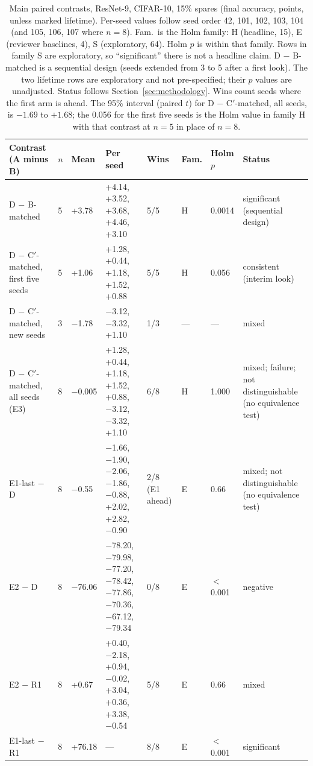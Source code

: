 \documentclass[journal]{IEEEtran}
\begin{document}
\begin{table}[t]
\centering
\caption{Main paired contrasts, ResNet-9, CIFAR-10, 15\% spares (final accuracy, points, unless marked lifetime). Per-seed values follow seed order 42, 101, 102, 103, 104 (and 105, 106, 107 where $n=8$). Fam.\ is the Holm family: H (headline, 15), E (reviewer baselines, 4), S (exploratory, 64). Holm $p$ is within that family. Rows in family S are exploratory, so ``significant'' there is not a headline claim. D $-$ B-matched is a sequential design (seeds extended from 3 to 5 after a first look). The two lifetime rows are exploratory and not pre-specified; their $p$ values are unadjusted. Status follows Section~\ref{sec:methodology}. Wins count seeds where the first arm is ahead. The 95\% interval (paired $t$) for D $-$ C$'$-matched, all seeds, is $-1.69$ to $+1.68$; the 0.056 for the first five seeds is the Holm value in family H with that contrast at $n=5$ in place of $n=8$.}
\label{tab:main}
\small
\begin{tabular}{p{3.0cm}p{0.4cm}p{0.95cm}p{4.6cm}p{1.35cm}p{0.55cm}p{1.15cm}p{2.3cm}}
\toprule
Contrast (A minus B) & $n$ & Mean & Per seed & Wins & Fam. & Holm $p$ & Status \\
\midrule
D $-$ B-matched & 5 & +3.78 & +4.14, +3.52, +3.68, +4.46, +3.10 & 5/5 & H & 0.0014 & significant (sequential design) \\
D $-$ C$'$-matched, first five seeds & 5 & +1.06 & +1.28, +0.44, +1.18, +1.52, +0.88 & 5/5 & H & 0.056 & consistent (interim look) \\
D $-$ C$'$-matched, new seeds & 3 & $-$1.78 & $-$3.12, $-$3.32, +1.10 & 1/3 & --- & --- & mixed \\
D $-$ C$'$-matched, all seeds (E3) & 8 & $-$0.005 & +1.28, +0.44, +1.18, +1.52, +0.88, $-$3.12, $-$3.32, +1.10 & 6/8 & H & 1.000 & mixed; failure; not distinguishable (no equivalence test) \\
E1-last $-$ D & 8 & $-$0.55 & $-$1.66, $-$1.90, $-$2.06, $-$1.86, $-$0.88, +2.02, +2.82, $-$0.90 & 2/8 (E1 ahead) & E & 0.66 & mixed; not distinguishable (no equivalence test) \\
E2 $-$ D & 8 & $-$76.06 & $-$78.20, $-$79.98, $-$77.20, $-$78.42, $-$77.86, $-$70.36, $-$67.12, $-$79.34 & 0/8 & E & $<$0.001 & negative \\
E2 $-$ R1 & 8 & +0.67 & +0.40, $-$2.18, +0.94, $-$0.02, +3.04, +0.36, +3.38, $-$0.54 & 5/8 & E & 0.66 & mixed \\
E1-last $-$ R1 & 8 & +76.18 & --- & 8/8 & E & $<$0.001 & significant \\

\end{tabular}
\end{table}
\end{document}
